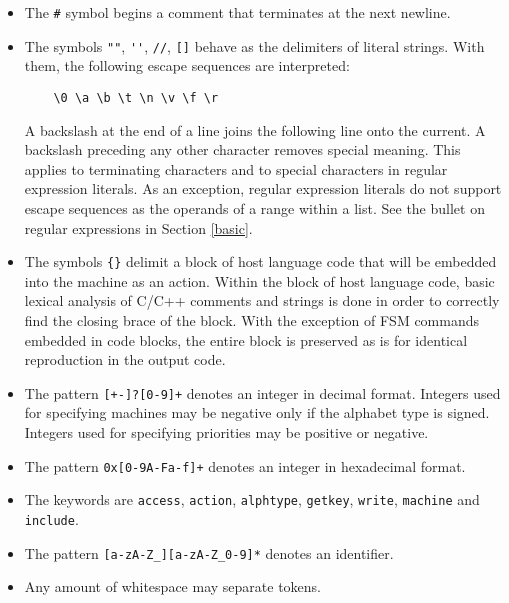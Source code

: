 \documentclass[letterpaper,11pt,oneside]{book}
\begin{document}
\begin{itemize}

\item The \verb|#| symbol begins a comment that terminates at the next newline.

\item The symbols \verb|""|, \verb|''|, \verb|//|, \verb|[]| behave as the
delimiters of literal strings. With them, the following escape sequences are interpreted: 

\verb|    \0 \a \b \t \n \v \f \r|

A backslash at the end of a line joins the following line onto the current. A
backslash preceding any other character removes special meaning. This applies
to terminating characters and to special characters in regular expression
literals. As an exception, regular expression literals do not support escape
sequences as the operands of a range within a list. See the bullet on regular
expressions in Section \ref{basic}.

\item The symbols \verb|{}| delimit a block of host language code that will be
embedded into the machine as an action.  Within the block of host language
code, basic lexical analysis of C/C++ comments and strings is done in order to
correctly find the closing brace of the block. With the exception of FSM
commands embedded in code blocks, the entire block is preserved as is for
identical reproduction in the output code.

\item The pattern \verb|[+-]?[0-9]+| denotes an integer in decimal format.
Integers used for specifying machines may be negative only if the alphabet type
is signed. Integers used for specifying priorities may be positive or negative.

\item The pattern \verb|0x[0-9A-Fa-f]+| denotes an integer in hexadecimal
format.

\item The keywords are \verb|access|, \verb|action|, \verb|alphtype|,
\verb|getkey|, \verb|write|, \verb|machine| and \verb|include|.

\item The pattern \verb|[a-zA-Z_][a-zA-Z_0-9]*| denotes an identifier.

%

\item Any amount of whitespace may separate tokens.

\end{itemize}
\end{document}
